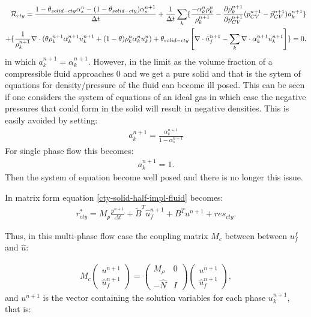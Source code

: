 \begin{eqnarray}
{\cal{R}}_{cty} =\frac{1-\theta_{solid-cty}\alpha_s^n  -(1-\theta_{solid-cty})\alpha_s^{n+1} }{\Delta t} +
\frac{1}{\Delta t} \sum_k\{
\frac{  - \alpha_k^n\rho_k^{n}} {\rho_k^{n+1}}
-  \frac{\partial \rho_k^{n+1}}{\partial p_{CV}^{n+1}} (p_{CV}^{n+1}-\tilde{p}_{CV}^{n+1}) a_k^{n+1} \}
\\
+
\{
\frac{1}{\rho_k^{n+1} } \nabla\cdot (\theta \rho_k^{n+1} \alpha_k^{n+1} u_k^{n+1}+(1-\theta) \rho_k^{n} \alpha_k^{n} u_k^{n})
+\theta_{solid-cty}\left[ \nabla\cdot\hat u_f^{n+1} - \sum_k \nabla\cdot \alpha_k^{n+1} u_k^{n+1} \right] \}
=0.
\label{cty-solid-half-impl-fluid}
\end{eqnarray}
in which $a_k^{n+1}=\alpha_k^{n+1}$.
However, in the limit as the volume fraction of a compressible
fluid approaches 0 and we get a pure solid and that is the sytem of equations for density/pressure
of the fluid can become ill posed. This can be seen if one considers the system of equations of an ideal gas
in which case the negative pressures that could form in the solid will result in negative densities. This is easily
avoided by setting:
\begin{eqnarray}
a_k^{n+1}=\frac{\alpha_k^{n+1}}{1-\alpha_s^{n+1}}
\label{a-1}
\end{eqnarray}
For single phase flow this becomes:
\begin{eqnarray}
a_k^{n+1}=1.
\label{a-2}
\end{eqnarray}
Then the system of equation become well posed and there is no longer this issue.





In matrix form equation \ref{cty-solid-half-impl-fluid} becomes:
\begin{eqnarray}
{r}_{cty}^* =M_p \frac{p^{n+1}}{\Delta t} + \tilde B^T \hat u_f^{n+1} + B^T u^{n+1} + res_{cty} .
\end{eqnarray}

Thus, in this multi-phase flow case the coupling matrix $M_c$ between between $u_f^f$ and $\hat u$:

\begin{eqnarray}
M_c
\begin{pmatrix}
u^{n+1} \\ \hat u_f^{n+1}
\end{pmatrix}
=
\begin{pmatrix}
M_\rho  & 0 \\
-\hat N  & I
\end{pmatrix}
\begin{pmatrix}
u^{n+1} \\ \hat u_f^{n+1}
\end{pmatrix}  ,
\end{eqnarray}
and $u^{n+1}$ is the vector containing the solution variables for each phase $u_k^{n+1}$, that is:

